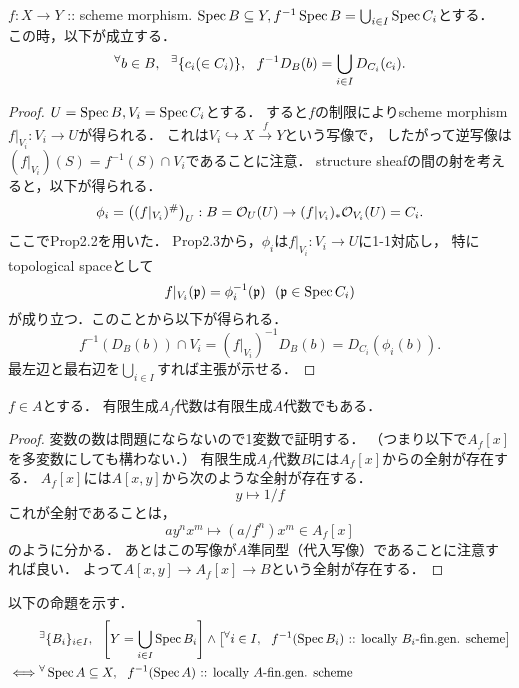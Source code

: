 \documentclass[a4paper]{jsarticle}
\begin{document}
\begin{Lemma}
    $f: X \to Y$ :: scheme morphism.
    $\operatorname{Spec} B \subseteq Y, f^{-1}\operatorname{Spec} B=\bigcup_{i \in I} \operatorname{Spec} C_i$とする．
    この時，以下が成立する．
    \[
        {}^{\forall} b \in B,~~ {}^{\exists} \{c_i(\in C_i)\},~~
        f^{-1}D_B(b)=\bigcup_{i \in I}D_{C_i}(c_i).
    \]
\end{Lemma}
\begin{proof}
    $U=\operatorname{Spec} B, V_i=\operatorname{Spec} C_i$とする．
    すると$f$の制限によりscheme morphism $f|_{V_i}: V_i \to U$が得られる．
    これは$V_i \hookrightarrow X \xrightarrow{f} Y$という写像で，
    したがって逆写像は$(f|_{V_i})(S)=f^{-1}(S) \cap V_i$であることに注意．
    structure sheafの間の射を考えると，以下が得られる．
    \[ \phi_i=\left((f|_{V_i})^{\#}\right)_{U}: B=\mathcal{O}_U(U) \to (f|_{V_i})_* \mathcal{O}_{V_i}(U)=C_i. \]
    ここでProp2.2を用いた．
    Prop2.3から，$\phi_i$は$f|_{V_i}: V_i \to U$に1-1対応し，
    特にtopological spaceとして
    \[ f|_{V_i}(\mathfrak{p})=\phi_i^{-1}(\mathfrak{p}) ~~(\mathfrak{p} \in \operatorname{Spec} C_i) \]
    が成り立つ．このことから以下が得られる．
    \[ f^{-1}(D_B(b)) \cap V_i=(f|_{V_i})^{-1}D_B(b)=D_{C_i}(\phi_i(b)). \]
    最左辺と最右辺を$\bigcup_{i \in I}$すれば主張が示せる．
\end{proof}

\begin{Lemma}
    $f \in A$とする．
    有限生成$A_{f}$代数は有限生成$A$代数でもある．
\end{Lemma}
\begin{proof}
    変数の数は問題にならないので1変数で証明する．
    （つまり以下で$A_{f}[x]$を多変数にしても構わない．）
    有限生成$A_{f}$代数$B$には$A_{f}[x]$からの全射が存在する．
    $A_{f}[x]$には$A[x,y]$から次のような全射が存在する．
    \[ y \mapsto 1/f \]
    これが全射であることは，
    \[ ay^nx^m \mapsto (a/f^n)x^m \in A_{f}[x] \]
    のように分かる．
    あとはこの写像が$A$準同型（代入写像）であることに注意すれば良い．
    よって$A[x,y] \to A_{f}[x] \to B$という全射が存在する．
\end{proof}

以下の命題を示す．
\begin{align*}
    {}&
    {}^{\exists} \{B_i\}_{i \in I},~~
    \left[Y=\bigcup_{i \in I} \operatorname{Spec} B_i\right] \land \left[{}^{\forall} i \in I,~~ f^{-1}(\operatorname{Spec} B_i)\text{ :: locally $B_i$-fin.gen. scheme}\right] \\
    \iff&
    {}^{\forall} \operatorname{Spec} A \subseteq X,~~ f^{-1}(\operatorname{Spec} A)\text{ :: locally $A$-fin.gen. scheme}
\end{align*}
\end{document}
